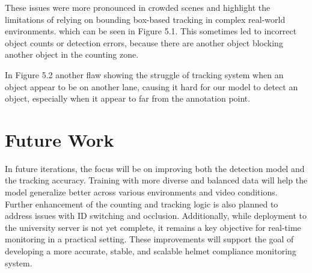 These issues were more pronounced in crowded scenes and highlight the limitations of relying on bounding box-based tracking in complex real-world environments. which can be seen in Figure 5.1. This sometimes led to incorrect object counts or detection errors, because there are another object blocking another object in the counting zone. 

In Figure 5.2 another flaw showing the struggle of tracking system when an object appear to be on another lane, causing it hard for our model to detect an object, especially when it appear to far from the annotation point. 


\section{Future Work}
\setlength{\parindent}{2.5em}
In future iterations, the focus will be on improving both the detection model and the tracking accuracy. Training with more diverse and balanced data will help the model generalize better across various environments and video conditions. Further enhancement of the counting and tracking logic is also planned to address issues with ID switching and occlusion. Additionally, while deployment to the university server is not yet complete, it remains a key objective for real-time monitoring in a practical setting. These improvements will support the goal of developing a more accurate, stable, and scalable helmet compliance monitoring system.



